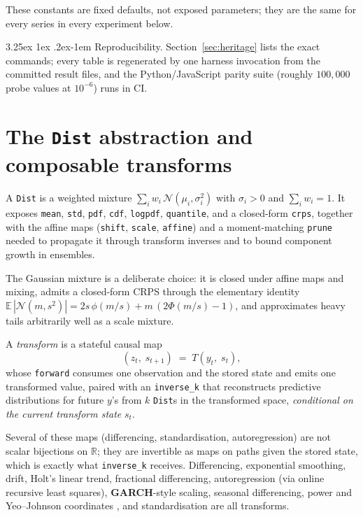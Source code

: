 \documentclass[article]{jss}
\makeatletter
\renewcommand\paragraph{\@startsection{paragraph}{4}{\z@}%
  {3.25ex \@plus1ex \@minus.2ex}{-1em}%
  {\normalfont\normalsize\itshape}}
\providecommand{\proglang}[1]{\textsf{#1}}
\providecommand{\pkg}[1]{\textbf{#1}}
\providecommand{\code}[1]{\texttt{#1}}
\makeatother
\begin{document}
These constants are fixed defaults, not exposed parameters; they are
the same for every series in every experiment below.

\paragraph{Reproducibility.}
Section~\ref{sec:heritage} lists the exact commands; every table is regenerated
by one harness invocation from the committed result files, and the
\proglang{Python}/\proglang{JavaScript} parity suite (roughly $100{,}000$ probe
values at $10^{-6}$) runs in CI.

\section{The \code{Dist} abstraction and composable transforms} \label{sec:dist}

A \code{Dist} is a weighted mixture $\sum_i w_i\,\mathcal N(\mu_i,\sigma_i^2)$
with $\sigma_i>0$ and $\sum_i w_i = 1$. It exposes \code{mean}, \code{std},
\code{pdf}, \code{cdf}, \code{logpdf}, \code{quantile}, and a closed-form
\code{crps}, together with the affine maps (\code{shift}, \code{scale},
\code{affine}) and a moment-matching \code{prune} needed to propagate it through
transform inverses and to bound component growth in ensembles.

The Gaussian
mixture is a deliberate choice: it is closed under affine maps and mixing, admits
a closed-form CRPS through the elementary identity
$\mathbb{E}\,|\mathcal N(m,s^2)| = 2 s\,\phi(m/s) + m\,(2\Phi(m/s)-1)$, and
approximates heavy tails arbitrarily well as a scale mixture.

A \emph{transform} is a stateful causal map
\[
(z_t,\; s_{t+1}) \;=\; T(y_t,\; s_t),
\]
whose \code{forward} consumes one observation and the stored state and emits one
transformed value, paired with an \code{inverse\_k} that reconstructs predictive
distributions for future $y$'s from $k$ \code{Dist}s in the transformed space,
\emph{conditional on the current transform state} $s_t$.

Several of these maps
(differencing, standardisation, autoregression) are not scalar bijections on
$\mathbb R$; they are invertible as maps on paths given the stored state, which
is exactly what \code{inverse\_k} receives. Differencing, exponential smoothing,
drift, Holt's linear trend, fractional differencing, autoregression (via online
recursive least squares), \pkg{GARCH}-style scaling, seasonal differencing,
power and Yeo--Johnson coordinates \citep{box1964analysis,yeo2000new}, and
standardisation are all transforms.
\end{document}
